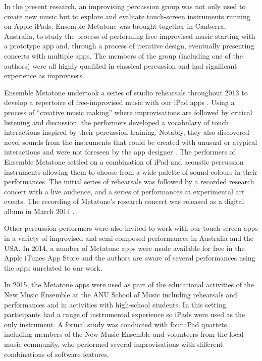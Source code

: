 \documentclass[graybox]{svmult}
\begin{document}
In the present research, an improvising percussion group was not only
used to create new music but to explore and evaluate touch-screen
instruments running on Apple iPads. Ensemble Metatone was brought
together in Canberra, Australia, to study the process of performing
free-improvised music starting with a prototype app and, through a
process of iterative design, eventually presenting concerts with
multiple apps. The members of the group (including one of the authors)
were all highly qualified in classical percussion and had significant
experience as improvisers.

Ensemble Metatone undertook a series of studio rehearsals throughout
2013 to develop a repertoire of free-improvised music with our iPad
apps \citep{Martin:2014jk}. Using a process of ``creative music
making'' \citep{Cahn:2005uq} where improvisations are followed by
critical listening and discussion, the performers developed a
vocabulary of touch interactions inspired by their percussion
training. Notably, they also discovered novel sounds from the
instruments that could be created with unusual or atypical
interactions and were not foreseen by the app
designer \citep{Martin:2014cr}. The performers of Ensemble Metatone
settled on a combination of iPad and acoustic percussion instruments
allowing them to choose from a wide palette of sound colours in their
performances. The initial series of rehearsals was followed by a
recorded research concert with a live audience, and a series of
performances at experimental art events. The recording of Metatone's
research concert was released as a digital album in March
2014 \citep{Ensemble-Metatone:2014sf}.

Other percussion performers were also invited to work with our
touch-screen apps in a variety of improvised and semi-composed
performances in Australia and the USA. In 2014, a number of Metatone
apps were made available for free in the Apple iTunes App Store and
the authors are aware of several performances using the apps unrelated
to our work.

In 2015, the Metatone apps were used as part of the educational
activities of the New Music Ensemble at the ANU School of Music
including rehearsals and performances and in activities with
high-school students. In this setting participants had a range of
instrumental experience so iPads were used as the only instrument. A
formal study was conducted with four iPad quartets, including members
of the New Music Ensemble and volunteers from the local music
community, who performed several improvisations with different
combinations of software features.
\end{document}
